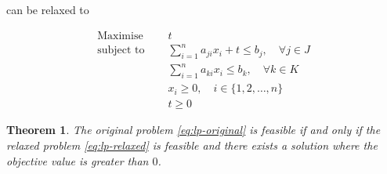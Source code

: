 \documentclass[preview,border=12pt,varwidth]{report}
\newtheorem{theorem}{Theorem}
\begin{document}
can be relaxed to

\begin{equation}
    \label{eq:lp-relaxed}
    \begin{split}
        \text{Maximise }   \quad & t                                                             \\
        \text{subject to } \quad & \sum_{i=1}^{n} a_{ji}x_{i} + t \le b_j, \quad \forall j \in J \\
        \quad                    & \sum_{i=1}^{n} a_{ki}x_{i} \le b_k, \quad \forall k \in K     \\
        & x_i \ge 0 , \quad i \in \{1, 2, \ldots, n\}                   \\
        & t \ge 0
    \end{split}
\end{equation}

\begin{theorem}
    The original problem \eqref{eq:lp-original} is feasible if and only if the relaxed problem \eqref{eq:lp-relaxed} is feasible and there exists a solution where the objective value is greater than $0$.
\end{theorem}
\end{document}

